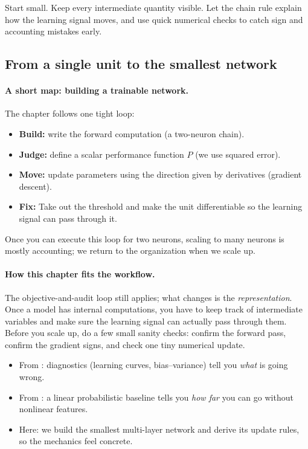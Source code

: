 \begin{tcolorbox}[summarybox, title={Design motif}]
Start small. Keep every intermediate quantity visible. Let the chain rule explain how the learning signal moves, and use quick numerical checks to catch sign and accounting mistakes early.
\end{tcolorbox}

\subsection{From a single unit to the smallest network}
\label{sec:mlp-limitations}

\paragraph{A short map: building a trainable network.}
The chapter follows one tight loop:
\begin{itemize}
    \item \textbf{Build:} write the forward computation (a two\hyp{}neuron chain).
    \item \textbf{Judge:} define a scalar performance function \(P\) (we use squared error).
    \item \textbf{Move:} update parameters using the direction given by derivatives (gradient descent).
    \item \textbf{Fix:} Take out the threshold and make the unit differentiable so the learning signal can pass through it.
\end{itemize}
Once you can execute this loop for two neurons, scaling to many neurons is mostly accounting; we return to the organization when we scale up.
\paragraph{How this chapter fits the workflow.}
The objective-and-audit loop still applies; what changes is the \emph{representation}. Once a model has internal computations, you have to keep track of intermediate variables and make sure the learning signal can actually pass through them. Before you scale up, do a few small sanity checks: confirm the forward pass, confirm the gradient signs, and check one tiny numerical update.
\begin{itemize}
    \item From : diagnostics (learning curves, bias--variance) tell you \emph{what} is going wrong.
    \item From : a linear probabilistic baseline tells you \emph{how far} you can go without nonlinear features.
    \item Here: we build the smallest multi-layer network and derive its update rules, so the mechanics feel concrete.
\end{itemize}

